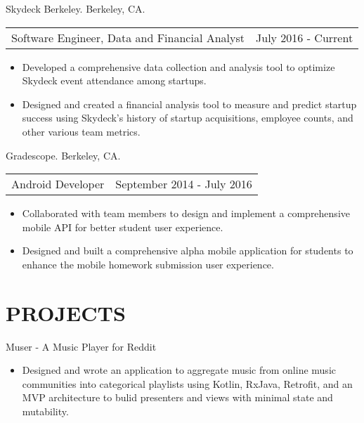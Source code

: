 \documentclass[10pt]{article}
\begin{document}
	   		
			   	Skydeck Berkeley. Berkeley, CA.
			   	\newline
			 		\hspace*{1em}\begin{tabu}{X[l]X[r]}
	                  	 Software Engineer, Data and Financial Analyst & July 2016 - Current
	                 \end{tabu}	
			  		\begin{itemize}
	                   		\item[] Developed a comprehensive data collection and analysis tool to optimize Skydeck event attendance among startups.
	                   		\item[] Designed and created a financial analysis tool to measure and predict startup success using Skydeck's history of startup acquisitions, employee counts, and other various team metrics.
	                  \end{itemize}
                  	 
                  	 
                  Gradescope. Berkeley, CA.
                  \newline	 
                 		\hspace*{1em}\begin{tabu}{X[l]X[r]}
                  		Android Developer & September 2014 - July 2016
                 		\end{tabu}
                 			\hspace*{1em}
                 			\begin{itemize}					        
                   			\item[] Collaborated with team members to design and implement a comprehensive mobile API for better student user experience.
                   			\item[] Designed and built a comprehensive alpha mobile application for students to enhance the mobile homework submission user experience.
                  		 \end{itemize}
                  
\section*{PROJECTS}
				Muser - A Music Player for Reddit
                 \hspace*{1em}\begin{itemize}
                 		\item[] Designed and wrote an application to aggregate music from online music communities into categorical playlists using Kotlin, RxJava, Retrofit, and an MVP architecture to bulid presenters and views with minimal state and mutability.
                 \end{itemize}
                
\end{document}
